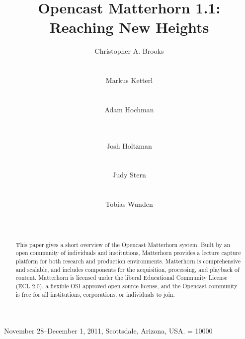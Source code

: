 \documentclass[letterpaper]{sig-alternate}
\begin{document}
 {November 28--December 1, 2011, Scottsdale, Arizona, USA.} 
\widowpenalty = 10000

\title{Opencast Matterhorn 1.1: Reaching New Heights}

\author{
%
\alignauthor
		Christopher A. Brooks \\
       \\
       \\
%
\alignauthor
		Markus Ketterl \titlenote{}\\
       \\
       \\
%
\alignauthor
		Adam Hochman\\
       \\
       \\
\and
%
\alignauthor
		Josh Holtzman\\
       \\
       \\
%
\alignauthor
		Judy Stern\\
       \\
       \\
%
\alignauthor
		Tobias Wunden\\
       \\
       \\
}


\maketitle
\begin{abstract}
This paper gives a short overview of the Opencast Matterhorn system.  Built by an open community of individuals and institutions, Matterhorn provides a lecture capture platform for both research and production environments.  Matterhorn is comprehensive and scalable, and includes components for the acquisition, processing, and playback of content.  Matterhorn is licensed under the liberal Educational Community License (ECL 2.0), a flexible OSI approved open source license, and the Opencast community is free for all institutions, corporations, or individuals to join.
\end{abstract}
\end{document}
